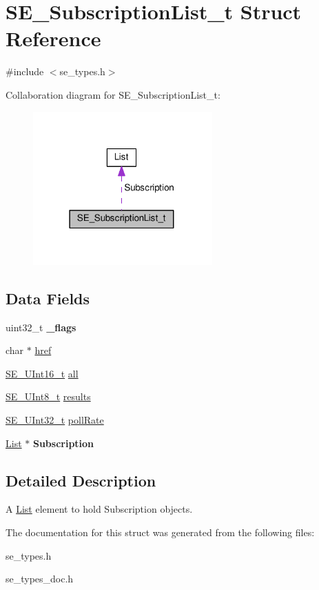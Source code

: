 \hypertarget{structSE__SubscriptionList__t}{}\section{S\+E\+\_\+\+Subscription\+List\+\_\+t Struct Reference}
\label{structSE__SubscriptionList__t}


{\ttfamily \#include $<$se\+\_\+types.\+h$>$}



Collaboration diagram for S\+E\+\_\+\+Subscription\+List\+\_\+t\+:\nopagebreak
\begin{figure}[H]
\begin{center}
\leavevmode
\includegraphics[width=195pt]{structSE__SubscriptionList__t__coll__graph}
\end{center}
\end{figure}
\subsection*{Data Fields}
\begin{DoxyCompactItemize}
\item 
uint32\+\_\+t {\bfseries \+\_\+flags}
\item 
char $\ast$ \hyperlink{group__SubscriptionList_ga1d0cf0063d777a5d8eee92223453fc62}{href}
\item 
\hyperlink{group__UInt16_gac68d541f189538bfd30cfaa712d20d29}{S\+E\+\_\+\+U\+Int16\+\_\+t} \hyperlink{group__SubscriptionList_ga596701373b60b51568eb8c8b02fd402d}{all}
\item 
\hyperlink{group__UInt8_gaf7c365a1acfe204e3a67c16ed44572f5}{S\+E\+\_\+\+U\+Int8\+\_\+t} \hyperlink{group__SubscriptionList_ga5af7ce11fb113e0ed4ff19b7d8c94b9a}{results}
\item 
\hyperlink{group__UInt32_ga70bd4ecda3c0c85d20779d685a270cdb}{S\+E\+\_\+\+U\+Int32\+\_\+t} \hyperlink{group__SubscriptionList_gab52e8c80eb79611d26ca5ba9bd2ddfb7}{poll\+Rate}
\item 
\hyperlink{structList}{List} $\ast$ {\bfseries Subscription}
\end{DoxyCompactItemize}


\subsection{Detailed Description}
A \hyperlink{structList}{List} element to hold Subscription objects. 

The documentation for this struct was generated from the following files\+:\begin{DoxyCompactItemize}
\item 
se\+\_\+types.\+h\item 
se\+\_\+types\+\_\+doc.\+h\end{DoxyCompactItemize}
